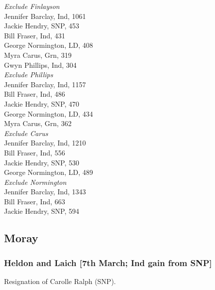\documentclass[a4paper,openany,10pt]{book}
\begin{document}
\emph{Exclude Finlayson}\\
Jennifer Barclay, Ind, 1061\\
Jackie Hendry, SNP, 453\\
Bill Fraser, Ind, 431\\
George Normington, LD, 408\\
Myra Carus, Grn, 319\\
Gwyn Phillips, Ind, 304\\




\emph{Exclude Phillips}\\
Jennifer Barclay, Ind, 1157\\
Bill Fraser, Ind, 486\\
Jackie Hendry, SNP, 470\\
George Normington, LD, 434\\
Myra Carus, Grn, 362\\




\emph{Exclude Carus}\\
Jennifer Barclay, Ind, 1210\\
Bill Fraser, Ind, 556\\
Jackie Hendry, SNP, 530\\
George Normington, LD, 489\\




\emph{Exclude Normington}\\
Jennifer Barclay, Ind, 1343\\
Bill Fraser, Ind, 663\\
Jackie Hendry, SNP, 594\\




\subsection*{Moray}

\subsubsection*{Heldon and Laich \hspace*{\fill}\nolinebreak[1]%
\enspace\hspace*{\fill}
[7th March; Ind gain from SNP]}


Resignation of Carolle Ralph (SNP).
\end{document}
